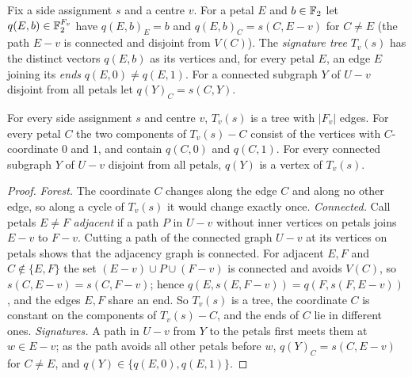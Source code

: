 Fix a side assignment $s$ and a centre $v$. For a petal $E$ and $b\in\mathbb F_2$
let $q(E,b)\in\mathbb F_2^{F_v}$ have $q(E,b)_E=b$ and $q(E,b)_C=s(C,E-v)$ for
$C\neq E$ (the path $E-v$ is connected and disjoint from $V(C)$). The
\emph{signature tree} $T_v(s)$ has the distinct vectors $q(E,b)$ as its
vertices and, for every petal $E$, an edge $E$ joining its \emph{ends}
$q(E,0)\neq q(E,1)$. For a connected subgraph $Y$ of $U-v$ disjoint from
all petals let $q(Y)_C=s(C,Y)$.

\begin{lemma}\label{lem:v4-sigtree}
For every side assignment $s$ and centre $v$, $T_v(s)$ is a tree with
$|F_v|$ edges. For every petal $C$ the two components of $T_v(s)-C$ consist
of the vertices with $C$-coordinate $0$ and $1$, and contain $q(C,0)$ and
$q(C,1)$. For every connected subgraph $Y$ of $U-v$ disjoint from all
petals, $q(Y)$ is a vertex of $T_v(s)$.
\end{lemma}

\begin{proof}
\emph{Forest.} The coordinate $C$ changes along the edge $C$ and along no
other edge, so along a cycle of $T_v(s)$ it would change exactly once.
\emph{Connected.} Call petals $E\neq F$ \emph{adjacent} if a path $P$ in
$U-v$ without inner vertices on petals joins $E-v$ to $F-v$. Cutting a path
of the connected graph $U-v$ at its vertices on petals shows that the
adjacency graph is connected. For adjacent $E,F$ and $C\notin\{E,F\}$ the
set $(E-v)\cup P\cup(F-v)$ is connected and avoids $V(C)$, so
$s(C,E-v)=s(C,F-v)$; hence $q(E,s(E,F-v))=q(F,s(F,E-v))$, and the edges
$E,F$ share an end. So $T_v(s)$ is a tree, the coordinate $C$ is constant on
the components of $T_v(s)-C$, and the ends of $C$ lie in different ones.
\emph{Signatures.} A path in $U-v$ from $Y$ to the petals first meets them
at $w\in E-v$; as the path avoids all other petals before $w$,
$q(Y)_C=s(C,E-v)$ for $C\neq E$, and $q(Y)\in\{q(E,0),q(E,1)\}$.
\end{proof}

